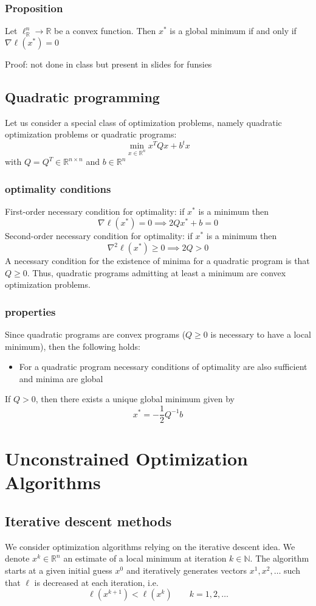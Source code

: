 \documentclass{book}
\newcommand{\R}{\mathbb{R}}
\newcommand{\N}{\mathbb{N}}
\theoremstyle{definition}
\theoremstyle{remark}
\theoremstyle{remark}
\begin{document}
\subsubsection{Proposition}
Let $\ell_\R^n \to \R$ be a convex function. Then $x^*$ is a global minimum if and only if $\nabla\ell(x^*)=0$

Proof: not done in class but present in slides for funsies

\subsection{Quadratic programming}
Let us consider a special class of optimization problems, namely quadratic optimization problems or quadratic programs: 
\[
    \min_{x\in\R^n}x^TQx+b^tx
\]
with $Q=Q^T\in\R^{n\times n}$ and $b\in\R^n$
\subsubsection{optimality conditions}
First-order necessary condition for optimality: if $x^*$ is a minimum then 
\[
    \nabla \ell(x^*)=0 \implies 2Qx^*+b=0
\]
Second-order necessary condition for optimality: if $x^*$ is a minimum then 
\[
    \nabla^2\ell(x^*)\geq 0 \implies 2Q>0
\]
A necessary condition for the existence of minima for a quadratic program is that $Q\geq 0$. Thus, quadratic programs admitting at least a minimum are convex optimization problems.
\subsubsection{properties}
Since quadratic programs are convex programs ($Q\geq 0$ is necessary to have a local minimum), then the following holds: 
\begin{itemize}
    \item For a quadratic program necessary conditions of optimality are also sufficient and minima are global
\end{itemize}
If $Q>0$, then there exists a unique global minimum given by 
\[
    x^* = -\displaystyle\frac{1}{2}Q^{-1}b
\]

\section{Unconstrained Optimization Algorithms}
\subsection{Iterative descent methods}
We consider optimization algorithms relying on the iterative descent idea. We denote $x^k\in\R^n$ an estimate of a local minimum at iteration $k\in\N$. The algorithm starts at a given initial guess $x^0$ and iteratively generates vectors $x^1,x^2,\dots$ such that $\ell$ is decreased at each iteration, i.e. 
\[
    \ell(x^{k+1})<\ell(x^k) \qquad k = 1,2,\dots
\]
\end{document}
